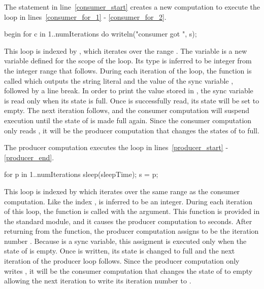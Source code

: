 The  statement in line~\ref{consumer_start} creates a 
new computation to execute the 
loop in lines~\ref{consumer_for_1} - \ref{consumer_for_2}.  
\begin{chapel}
begin {                                
  for c in 1..numIterations do        
    writeln("consumer got ", s);     
}                                   
\end{chapel}
This loop is indexed by , which iterates over the
range .  The variable  is a new
variable defined for the scope of the loop.  Its type is inferred to
be integer from the integer range that follows.  During each iteration
of the  loop, the  function is called which
outputs the string literal  and the value of the
sync variable , followed by a line break.  In order to print
the value stored in , the sync variable is read only when its
state is full.  Once  is successfully read, its state will be
set to empty.  The next iteration follows, and the consumer
computation will suspend execution until the state of  is made
full again.  Since the consumer computation only reads , it
will be the producer computation that changes the states of 
to full.

The producer computation executes the  loop in lines~\ref{producer_start} -
\ref{producer_end}.  
\begin{chapel}
for p in 1..numIterations {            
  sleep(sleepTime);   
  s = p;
}      
\end{chapel}
This loop is indexed by  which iterates over the same range as
the consumer computation.  Like the index ,  is
inferred to be an integer.  During each iteration of this 
loop, the  function is called with the
argument.  This  function is provided in
the  standard module, and it causes the producer
computation to
 seconds.  After returning from the  function, 
the producer computation assigns  to be the iteration number .  
Because  is a sync variable, this assigment is executed only when the state of 
 is empty.  Once  is written, its state is changed to full and the
next iteration of the producer loop follows.  Since the producer computation only
writes , it will be the consumer computation that changes the state of
 to empty allowing the next iteration to write its iteration number
to .

